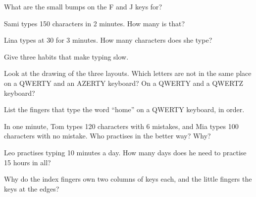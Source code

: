 \begin{exercise}[$\star$]\label{exo:g3:typing-with-ten-fingers:3}
What are the small bumps on the F and J keys for?
\end{exercise}

\begin{exercise}[$\star$]\label{exo:g3:typing-with-ten-fingers:4}
Sami types 150 characters in 2 minutes. How many  is that?
\end{exercise}

\begin{exercise}[$\star$]\label{exo:g3:typing-with-ten-fingers:5}
Lina types at 30  for 3 minutes. How many characters does she
type?
\end{exercise}

\begin{exercise}[$\star$]\label{exo:g3:typing-with-ten-fingers:6}
Give three habits that make typing slow.
\end{exercise}

\begin{exercise}[$\star$]\label{exo:g3:typing-with-ten-fingers:7}
Look at the drawing of the three layouts. Which letters are not in the same
place on a QWERTY and an AZERTY keyboard? On a QWERTY and a QWERTZ keyboard?
\end{exercise}

\begin{exercise}[$\star\star$]\label{exo:g3:typing-with-ten-fingers:8}
List the fingers that type the word ``home'' on a QWERTY keyboard, in order.
\end{exercise}

\begin{exercise}[$\star\star$]\label{exo:g3:typing-with-ten-fingers:9}
In one minute, Tom types 120 characters with 6 mistakes, and Mia types 100
characters with no mistake. Who practises in the better way? Why?
\end{exercise}

\begin{exercise}[$\star\star$]\label{exo:g3:typing-with-ten-fingers:10}
Leo practises typing 10 minutes a day. How many days does he need to practise
15 hours in all?
\end{exercise}

\begin{exercise}[$\star\star$]\label{exo:g3:typing-with-ten-fingers:11}
Why do the index fingers own two columns of keys each, and the little fingers
the keys at the edges?
\end{exercise}
